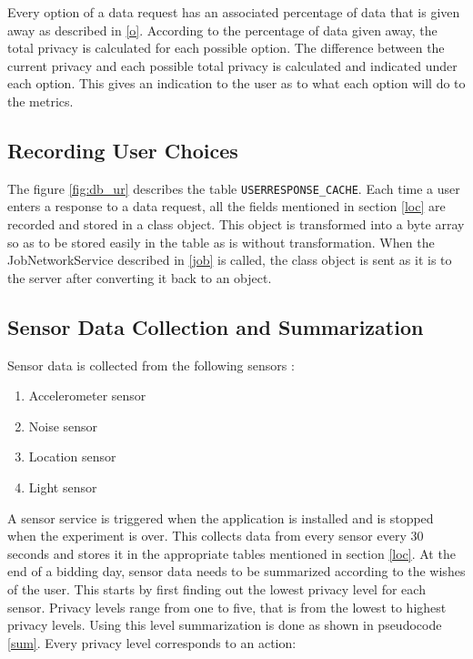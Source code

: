 Every option of a data request has an associated percentage of data that is given away as described in \ref{o}. According to the percentage of data given away, the total privacy is calculated for each possible option. The difference between the current privacy and each possible total privacy is calculated and indicated under each option. This gives an indication to the user as to what each option will do to the metrics.

\subsection{Recording User Choices}

The figure \ref{fig:db_ur} describes the table \texttt{USERRESPONSE\_CACHE}. Each time a user enters a response to a data request, all the fields mentioned in section
\ref{loc} are recorded and stored in a class object. This object is transformed into a byte array so as to be stored easily in the table as is without transformation.
When the JobNetworkService described in \ref{job} is called, the class object is sent as it is to the server after converting it back to an object.


\subsection{Sensor Data Collection and Summarization} 

Sensor data is collected from the following sensors :

\begin{enumerate}
	\item Accelerometer sensor
	\item Noise sensor
    \item Location sensor
    \item Light sensor
\end{enumerate}

A sensor service is triggered when the application is installed and is stopped when the experiment is over. This collects data from every sensor
every 30 seconds and stores it in the appropriate tables mentioned in section \ref{loc}.
At the end of a bidding day, sensor data needs to be summarized according to the wishes of the user. This starts by first finding out the lowest privacy level for each sensor. Privacy levels range from one to five, that is from the lowest to highest privacy levels. Using this level
summarization is done as shown in pseudocode \ref{sum}. Every privacy level corresponds to an action:

